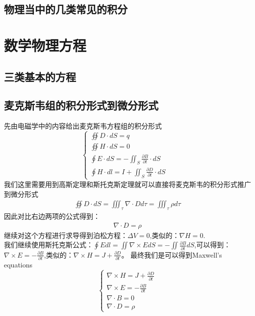 \documentclass[UTF8]{article}
\begin{document}
\subsection{物理当中的几类常见的积分}
\section{数学物理方程}
\subsection{三类基本的方程}
\subsection{麦克斯韦组的积分形式到微分形式}
先由电磁学中的内容给出麦克斯韦方程组的积分形式
\begin{equation*}
	\left\{
	\begin{array}{lr}
		\oiint D\cdot dS=q                                             & \\
		\oiint H\cdot dS=0                                             & \\
		\oint E\cdot dS=-\iint_S \frac{\partial B}{\partial t}\cdot dS & \\
		\oint H\cdot dl=I+\iint_S \frac{\partial D}{\partial t}\cdot dS
	\end{array}
	\right.
\end{equation*}
我们这里需要用到高斯定理和斯托克斯定理就可以直接将麦克斯韦的积分形式推广到微分形式
\begin{align*}
	\oiint D\cdot dS=\iiint_\tau \nabla \cdot D d\tau=\iiint_{\tau}\rho d\tau
\end{align*}
因此对比右边两项的公式得到：
\begin{align*}
	\nabla\cdot D=\rho
\end{align*}
继续对这个方程进行求导得到泊松方程：$\Delta V=0$,类似的：$\nabla H=0$.\\
我们继续使用斯托克斯公式：$\oint E dl=\iint \nabla \times E dS=-\iint \frac{\partial B}{\partial t}dS$,可以得到：$\nabla\times E=-\frac{\partial B}{\partial t}$,类似的：$\nabla \times H=J+\frac{\partial D}{\partial t}$。
最终我们是可以得到Maxwell's equations
\begin{equation*}
	\left\{
	\begin{array}{lr}
		\nabla \times H=J+\frac{\partial D}{\partial t} \\
		\nabla\times E=-\frac{\partial B}{\partial t}   \\
		\nabla\cdot B=0                                 \\
		\nabla\cdot D=\rho
	\end{array}
	\right.
\end{equation*}
\end{document}

